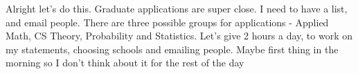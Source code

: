 \noindent {}

Alright let's do this. Graduate applications are super close. I need to have a list, and email people. There are three possible groups for applications - Applied Math, CS Theory, Probability and Statistics. Let's give 2 hours a day, to work on my statements, choosing schools and emailing people. Maybe first thing in the morning so I don't think about it for the rest of the day

